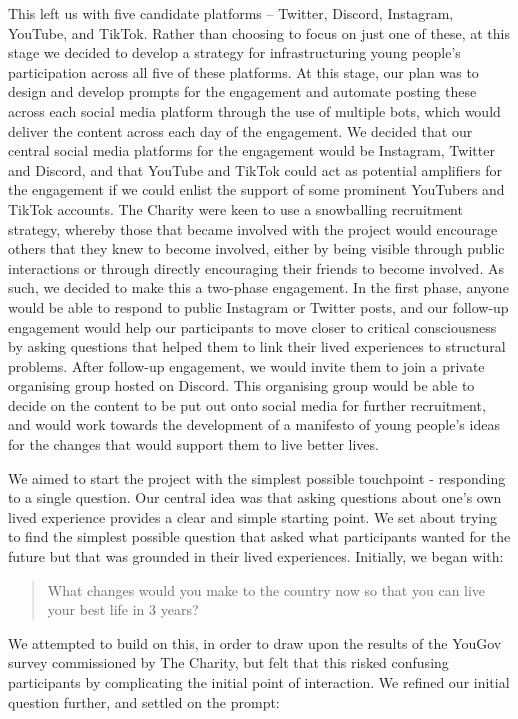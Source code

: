 This left us with five candidate platforms – Twitter, Discord, Instagram, YouTube, and TikTok. Rather than choosing to focus on just one of these, at this stage we decided to develop a strategy for infrastructuring young people's participation across all five of these platforms. At this stage, our plan was to design and develop prompts for the engagement and automate posting these across each social media platform through the use of multiple bots, which would deliver the content across each day of the engagement. We decided  that our central social media platforms for the engagement would be Instagram, Twitter and Discord, and that YouTube and TikTok could act as potential amplifiers for the engagement if we could enlist the support of some prominent YouTubers and TikTok accounts. The Charity were keen to use a snowballing recruitment strategy, whereby those that became involved with the project would encourage others that they knew to become involved, either by being visible through public interactions or through directly encouraging their friends to become involved. As such, we decided to make this a two-phase engagement. In the first phase, anyone would be able to respond to public Instagram or Twitter posts, and our follow-up engagement would help our participants to move closer to critical consciousness by asking questions that helped them to link their lived experiences to structural problems. After follow-up engagement, we would invite them to join a private organising group hosted on Discord. This organising group would be able to decide on the content to be put out onto social media for further recruitment, and would work towards the development of a manifesto of young people's ideas for the changes that would support them to live better lives. 

We aimed to start the project with the simplest possible touchpoint - responding to a single question. Our central idea was that asking questions about one’s own lived experience provides a clear and simple starting point. We set about trying to find the simplest possible question that asked what participants wanted for the future but that was grounded in their lived experiences. Initially, we began with:
\begin{quote}
What changes would you make to the country now so that you can live your best life in 3 years?
\end{quote}

We attempted to build on this, in order to draw upon the results of the YouGov survey commissioned by The Charity, but felt that this risked confusing participants by complicating the initial point of interaction. We refined our initial question further, and settled on the prompt:

